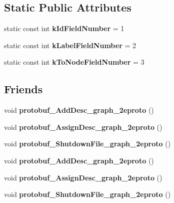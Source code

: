 \subsection*{Static Public Attributes}
\begin{DoxyCompactItemize}
\item 
\hypertarget{classgraph_1_1Graph__Edge_a72855929893523a2ab0b28c29e6de404}{
static const int {\bfseries kIdFieldNumber} = 1}
\label{classgraph_1_1Graph__Edge_a72855929893523a2ab0b28c29e6de404}

\item 
\hypertarget{classgraph_1_1Graph__Edge_a6a3f7f24e4560ba96be0534f45781197}{
static const int {\bfseries kLabelFieldNumber} = 2}
\label{classgraph_1_1Graph__Edge_a6a3f7f24e4560ba96be0534f45781197}

\item 
\hypertarget{classgraph_1_1Graph__Edge_a15d36a93bd22e587021c53b7b3e16e84}{
static const int {\bfseries kToNodeFieldNumber} = 3}
\label{classgraph_1_1Graph__Edge_a15d36a93bd22e587021c53b7b3e16e84}

\end{DoxyCompactItemize}
\subsection*{Friends}
\begin{DoxyCompactItemize}
\item 
\hypertarget{classgraph_1_1Graph__Edge_a3216c708da10839178deebea43d6f0be}{
void {\bfseries protobuf\_\-AddDesc\_\-graph\_\-2eproto} ()}
\label{classgraph_1_1Graph__Edge_a3216c708da10839178deebea43d6f0be}

\item 
\hypertarget{classgraph_1_1Graph__Edge_a4c9d7eb8f9e30e490c8bcae70e629de5}{
void {\bfseries protobuf\_\-AssignDesc\_\-graph\_\-2eproto} ()}
\label{classgraph_1_1Graph__Edge_a4c9d7eb8f9e30e490c8bcae70e629de5}

\item 
\hypertarget{classgraph_1_1Graph__Edge_aac10332314561225d8ac09b797223f3d}{
void {\bfseries protobuf\_\-ShutdownFile\_\-graph\_\-2eproto} ()}
\label{classgraph_1_1Graph__Edge_aac10332314561225d8ac09b797223f3d}

\item 
\hypertarget{classgraph_1_1Graph__Edge_a3216c708da10839178deebea43d6f0be}{
void {\bfseries protobuf\_\-AddDesc\_\-graph\_\-2eproto} ()}
\label{classgraph_1_1Graph__Edge_a3216c708da10839178deebea43d6f0be}

\item 
\hypertarget{classgraph_1_1Graph__Edge_a4c9d7eb8f9e30e490c8bcae70e629de5}{
void {\bfseries protobuf\_\-AssignDesc\_\-graph\_\-2eproto} ()}
\label{classgraph_1_1Graph__Edge_a4c9d7eb8f9e30e490c8bcae70e629de5}

\item 
\hypertarget{classgraph_1_1Graph__Edge_aac10332314561225d8ac09b797223f3d}{
void {\bfseries protobuf\_\-ShutdownFile\_\-graph\_\-2eproto} ()}
\label{classgraph_1_1Graph__Edge_aac10332314561225d8ac09b797223f3d}

\end{DoxyCompactItemize}


